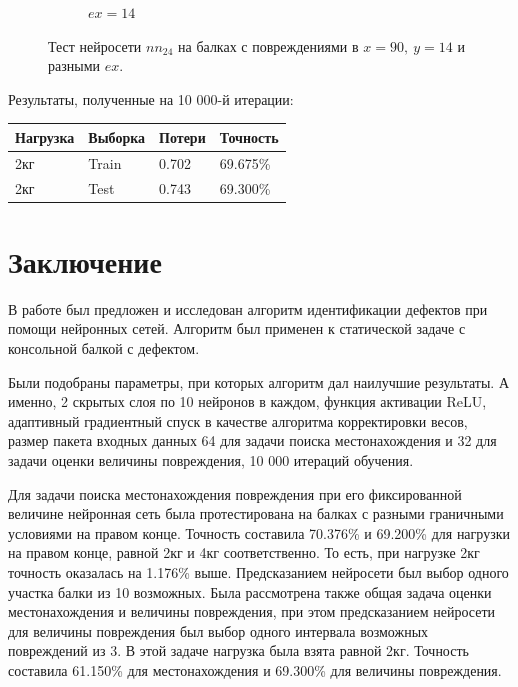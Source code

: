 \documentclass[a4paper,12pt]{article}
\theoremstyle{remark}
\begin{document}
\begin{figure}[h]
\begin{subfigure}{0.33\textwidth}
			\caption{$ex=14$}
		\end{subfigure}
		\caption{Тест нейросети $nn_{24}$ на балках с повреждениями в $x=90,\ y=14$ и разными $ex$.}
		\label{fig:nn3_damage_90_14}
	\end{figure}

	Результаты, полученные на 10 000-й итерации: \\
	
	\begin{tabular}{| l | l | l | l |}
		\hline
		Нагрузка & Выборка & Потери & Точность \\
		\hline
		2кг & Train & 0.702 & 69.675\% \\
		\hline
		2кг & Test & 0.743 & 69.300\% \\
		\hline
	\end{tabular}
	
	\newpage
	\section{Заключение}
	
	
	В работе был предложен и исследован алгоритм идентификации дефектов при помощи нейронных сетей. Алгоритм был применен к статической задаче с консольной балкой с дефектом.
	
	Были подобраны параметры, при которых алгоритм дал наилучшие результаты. А именно, 2 скрытых слоя по 10 нейронов в каждом, функция активации ReLU, адаптивный градиентный спуск в качестве алгоритма корректировки весов, размер пакета входных данных 64 для задачи поиска местонахождения и 32 для задачи оценки величины повреждения, 10 000 итераций обучения.
	
	Для задачи поиска местонахождения повреждения при его фиксированной величине нейронная сеть была протестирована на балках с разными граничными условиями на правом конце. Точность составила 70.376\% и 69.200\% для нагрузки на правом конце, равной 2кг и 4кг соответственно. То есть, при нагрузке 2кг точность оказалась на 1.176\% выше. Предсказанием нейросети был выбор одного участка балки из 10 возможных. Была рассмотрена также общая задача оценки местонахождения и величины повреждения, при этом предсказанием нейросети для величины повреждения был выбор одного интервала возможных повреждений из 3. В этой задаче нагрузка была взята равной 2кг. Точность составила 61.150\% для местонахождения и 69.300\% для величины повреждения.
	
\end{document}
